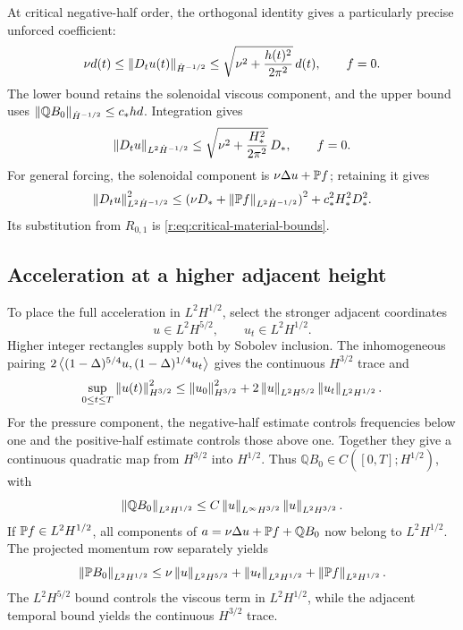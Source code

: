 At critical negative-half order, the orthogonal identity gives a
particularly precise unforced coefficient:
\begin{equation}
 \nu d(t)\le\left\lVert D_tu(t)\right\rVert_{\dot H^{-1/2}}
 \le\sqrt{\nu^2+\frac{h(t)^2}{2\pi^2}}\,d(t),
 \qquad f=0.
 \label{r:eq:critical-acceleration-two-sided}
\end{equation}
The lower bound retains the solenoidal viscous component, and the upper
bound uses \(\left\lVert \mathbb QB_0\right\rVert_{\dot H^{-1/2}}\le c_*hd\).
Integration gives
\[
 \left\lVert D_tu\right\rVert_{L^2\dot H^{-1/2}}
 \le\sqrt{\nu^2+\frac{H_*^2}{2\pi^2}}\,D_*,\qquad f=0.
\]
For general forcing, the solenoidal component is
\(\nu\Delta u+\mathbb P f\); retaining it gives
\begin{equation}
 \left\lVert D_tu\right\rVert_{L^2\dot H^{-1/2}}^2
 \le\left(\nu D_*+\left\lVert \mathbb P f\right\rVert_{L^2\dot H^{-1/2}}\right)^2
       +c_*^2H_*^2D_*^2.
 \label{r:eq:critical-acceleration-general-coordinates}
\end{equation}
Its substitution from \(R_{0,1}\) is
\eqref{r:eq:critical-material-bounds}.

\subsection{Acceleration at a higher adjacent height}

To place the full acceleration in \(L^2H^{1/2}\), select the stronger
adjacent coordinates
\begin{equation}
 u\in L^2H^{5/2},\qquad u_t\in L^2H^{1/2}.
 \label{r:eq:stronger-acceleration-coordinates}
\end{equation}
Higher integer rectangles supply both by Sobolev inclusion.  The
inhomogeneous pairing
\(2\left\langle (1-\Delta)^{5/4}u,(1-\Delta)^{1/4}u_t\right\rangle\)
gives the continuous \(H^{3/2}\) trace and
\begin{equation}
 \sup_{0\le t\le T}\left\lVert u(t)\right\rVert_{H^{3/2}}^2
 \le\left\lVert u_0\right\rVert_{H^{3/2}}^2
 +2\left\lVert u\right\rVert_{L^2H^{5/2}}\left\lVert u_t\right\rVert_{L^2H^{1/2}}.
 \label{r:eq:stronger-acceleration-trace}
\end{equation}
For the pressure component, the negative-half estimate controls
frequencies below one and the positive-half estimate controls those
above one.  Together they give a continuous quadratic map from
\(H^{3/2}\) into \(H^{1/2}\).  Thus
\(\mathbb QB_0\in C([0,T];H^{1/2})\), with
\begin{equation}
 \left\lVert \mathbb QB_0\right\rVert_{L^2H^{1/2}}
 \le C\left\lVert u\right\rVert_{L^\infty H^{3/2}}
         \left\lVert u\right\rVert_{L^2H^{3/2}}.
 \label{r:eq:stronger-pressure-time}
\end{equation}
If \(\mathbb P f\in L^2H^{1/2}\), all components of
\(a=\nu\Delta u+\mathbb P f+\mathbb QB_0\) now belong to
\(L^2H^{1/2}\).  The projected momentum row separately yields
\begin{equation}
 \left\lVert \mathbb P B_0\right\rVert_{L^2H^{1/2}}
 \le\nu\left\lVert u\right\rVert_{L^2H^{5/2}}
 +\left\lVert u_t\right\rVert_{L^2H^{1/2}}
 +\left\lVert \mathbb P f\right\rVert_{L^2H^{1/2}}.
 \label{r:eq:stronger-projected-transport}
\end{equation}
The \(L^2H^{5/2}\) bound controls the viscous term in
\(L^2H^{1/2}\), while the adjacent temporal bound yields
the continuous \(H^{3/2}\) trace.


